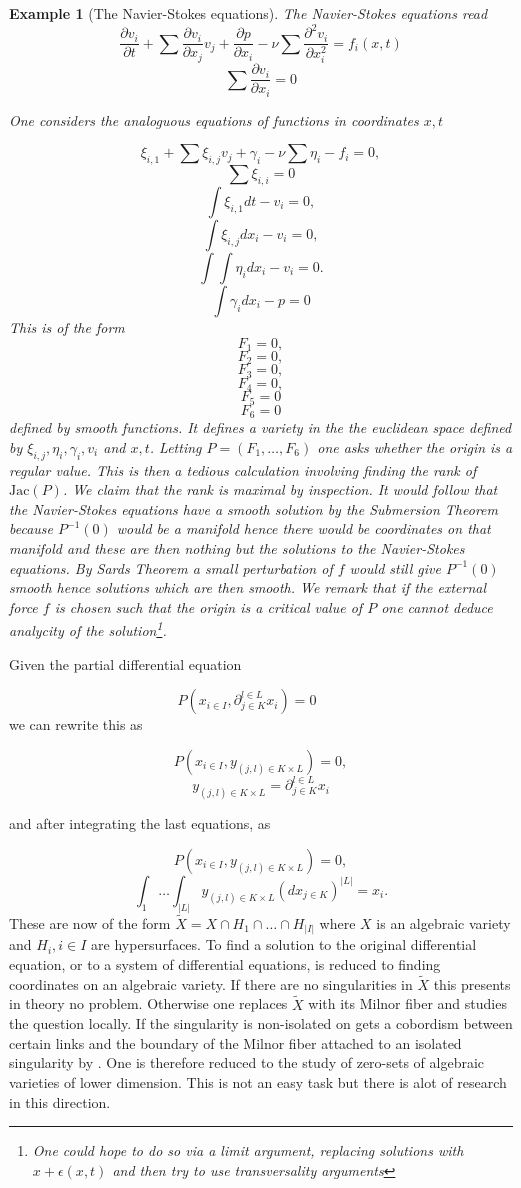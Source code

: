 \documentclass[10pt,a4paper]{amsart}
\newtheorem{example}{Example}
\begin{document}
\begin{example}[The Navier-Stokes equations]
The Navier-Stokes equations read 
$$\frac{\partial v_i}{\partial t}+\sum \frac{\partial v_i}{\partial x_j} v_j + \frac{\partial p}{\partial x_i} -\nu \sum\frac{\partial^2 v_i}{\partial x_i^2} = f_i(x, t)$$
$$\sum \frac{\partial v_i}{\partial x_i}=0$$

One considers the analoguous equations of functions in coordinates $x, t$

$$\xi_{i, 1}+\sum \xi_{i, j} v_j+\gamma_i-\nu\sum \eta_i-f_i=0,$$
$$\sum \xi_{i, i}=0$$
$$\int \xi_{i, 1} dt-v_i=0,$$
$$\int \xi_{i,j} dx_i-v_i=0,$$
$$\int\int \eta_i dx_i-v_i=0.$$
$$\int \gamma_i dx_i-p=0$$
This is of the form
$$F_1=0,$$
$$F_2=0,$$
$$F_3=0,$$
$$F_4=0,$$
$$F_5=0$$
$$F_6=0$$
defined by smooth functions. It defines a variety in the the euclidean space defined by $\xi_{i, j}, \eta_i, \gamma_i, v_i$ and $x, t$. Letting 
$P=(F_1,\dots, F_6)$ one asks whether the origin is a regular value. This is then a tedious calculation involving finding the rank of $\text{Jac}(P)$. We claim that the rank is maximal by inspection. It would follow that the Navier-Stokes equations have a smooth solution by the Submersion Theorem because $P^{-1}(0)$ would be a manifold hence there would be coordinates on that manifold and these are then nothing but the solutions to the Navier-Stokes equations. By Sards Theorem a small perturbation of $f$ would still give $P^{-1}(0)$ smooth hence  solutions which are then smooth. 
We remark that if the external force $f$ is chosen such that the origin is a critical value of $P$ one cannot deduce analycity of the solution\footnote{One could hope to do so via a limit argument, replacing solutions with $x+\epsilon(x, t)$ and then try to use transversality arguments}.
\end{example}

Given the partial differential equation

$$P(x_{i\in I}, \partial_{j\in K}^{l\in L} x_i)=0\qquad $$
we can rewrite this as

$$P(x_{i\in I}, y_{(j,l) \in K\times L})=0,$$
$$y_{(j, l)\in K\times L}=\partial_{j\in K}^{l\in L} x_i $$

and after integrating the last equations, as

$$P(x_{i\in I}, y_{(j,l) \in K\times L})=0,$$
$$\int_1\dots\int_{|L|} y_{(j, l)\in K\times L} (dx_{j\in K})^{|L|}= x_i. $$
These are now of the form $\tilde{X}=X\cap H_1\cap\dots\cap H_{|I|}$ where $X$ is an algebraic variety and $H_i, i\in I$ are hypersurfaces. To find a solution to the original differential equation, or to a system of differential equations, is reduced to finding coordinates on an algebraic variety. If there are no singularities in $\tilde{X}$ this presents in theory no problem. Otherwise one replaces $\tilde{X}$ with its Milnor fiber and studies the question locally. If the singularity is non-isolated on gets a cobordism between certain links and the boundary of the Milnor fiber attached to an isolated singularity by \cite{LarsIV}. One is therefore reduced to the study of zero-sets of algebraic varieties of lower dimension. This is not an easy task but there is alot of research in this direction.\\
\end{document}
